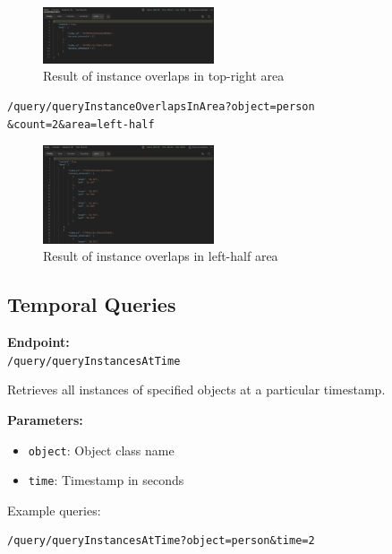 \documentclass[conference]{IEEEtran}
\begin{document}
\begin{figure}[H]
    \centering
    \includegraphics[width=0.45\textwidth]{8.jpeg}
    \caption{Result of instance overlaps in top-right area}
    \label{fig:query8}
\end{figure}

\begin{minipage}{\linewidth}
\scriptsize
\begin{verbatim}
/query/queryInstanceOverlapsInArea?object=person
&count=2&area=left-half
\end{verbatim}
\end{minipage}

\begin{figure}[H]
    \centering
    \includegraphics[width=0.45\textwidth]{9.jpeg}
    \caption{Result of instance overlaps in left-half area}
    \label{fig:query9}
\end{figure}

\subsection{Temporal Queries}
\textbf{Endpoint:} \\ 
\texttt{/query/queryInstancesAtTime}

Retrieves all instances of specified objects at a particular timestamp.

\textbf{Parameters:}
\begin{itemize}
    \item \texttt{object}: Object class name
    \item \texttt{time}: Timestamp in seconds
\end{itemize}

Example queries:\\
\begin{minipage}{\linewidth}
\scriptsize
\begin{verbatim}
/query/queryInstancesAtTime?object=person&time=2
\end{verbatim}
\end{minipage}
\end{document}
